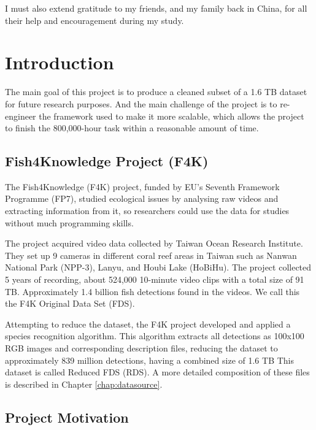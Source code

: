 \documentclass[bsc,logo,twoside,fullspacing,parskip]{infthesis}
\begin{document}
I must also extend gratitude to my friends, and my family back in China, for all their help and encouragement during my study.

\newpage

\standarddeclaration

\tableofcontents


\chapter{Introduction}


The main goal of this project is to produce a cleaned subset of a 1.6 TB dataset for future research purposes. 
And the main challenge of the project is to re-engineer the framework used to make it more scalable, which allows the project to finish the 800,000-hour task within a reasonable amount of time.

\section{Fish4Knowledge Project (F4K)}

The Fish4Knowledge (F4K) project, funded by EU's Seventh Framework Programme (FP7), studied ecological issues by analysing raw videos and extracting information from it, so researchers could use the data for studies without much programming skills. 

The project acquired video data collected by Taiwan Ocean Research Institute. 
They set up 9 cameras in different coral reef areas in Taiwan such as Nanwan National Park (NPP-3), Lanyu, and Houbi Lake (HoBiHu). 
The project collected 5 years of recording, about 524,000 10-minute video clips with a total size of 91 TB. Approximately 1.4 billion fish detections found in the videos. 
We call this the F4K Original Data Set (FDS). 

Attempting to reduce the dataset, the F4K project developed and applied a species recognition algorithm. 
This algorithm extracts all detections as 100x100 RGB images and corresponding description files, reducing the dataset to approximately 839 million detections, having a combined size of 1.6 TB
This dataset is called Reduced FDS (RDS).
A more detailed composition of these files is described in Chapter \ref{chap:datasource}.

\section{Project Motivation}
\end{document}
